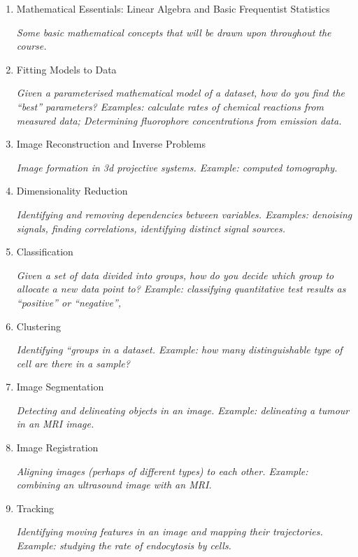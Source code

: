 \documentclass[12pt,a4paper]{tufte-handout}
\begin{document}
\begin{enumerate}
  \item Mathematical Essentials: Linear Algebra and Basic Frequentist Statistics
    
    \textit{Some basic mathematical concepts that will be drawn upon throughout the course.}
    
  \item Fitting Models to Data

    \textit{Given a parameterised mathematical model of a dataset, how do you find the ``best'' parameters? Examples: calculate rates of chemical reactions from measured data; Determining fluorophore concentrations from emission data.}

  \item Image Reconstruction and Inverse Problems

    \textit{Image formation in 3d projective systems. Example: computed tomography.}

  \item Dimensionality Reduction

    \textit{Identifying and removing dependencies between variables. Examples: denoising signals, finding correlations, identifying distinct signal sources.}

  \item Classification

    \textit{Given a set of data divided into groups, how do you decide which group to allocate a new data point to? Example: classifying quantitative test results as ``positive'' or ``negative'', }

  \item Clustering

    \textit{Identifying ``groups in a dataset. Example: how many distinguishable type of cell are there in a sample?}

  \item Image Segmentation

    \textit{Detecting and delineating objects in an image. Example: delineating a tumour in an MRI  image.}

  \item Image Registration

    \textit{Aligning images (perhaps of different types) to each other. Example: combining an ultrasound image with an MRI.}

  \item Tracking

    \textit{Identifying moving features in an image and mapping their trajectories. Example: studying the rate of endocytosis by cells.}

\end{enumerate}
\end{document}
